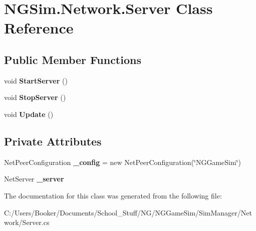 \hypertarget{class_n_g_sim_1_1_network_1_1_server}{}\section{N\+G\+Sim.\+Network.\+Server Class Reference}
\label{class_n_g_sim_1_1_network_1_1_server}
\subsection*{Public Member Functions}
\begin{DoxyCompactItemize}
\item 
\mbox{\label{class_n_g_sim_1_1_network_1_1_server_ad163d27bbb91a29d2df0f96593614671}} 
void {\bfseries Start\+Server} ()
\item 
\mbox{\label{class_n_g_sim_1_1_network_1_1_server_a575bb1a212877a0d59f7a265260ea7c8}} 
void {\bfseries Stop\+Server} ()
\item 
\mbox{\label{class_n_g_sim_1_1_network_1_1_server_a7daa039ef7de7d23dbae2837b572692d}} 
void {\bfseries Update} ()
\end{DoxyCompactItemize}
\subsection*{Private Attributes}
\begin{DoxyCompactItemize}
\item 
\mbox{\label{class_n_g_sim_1_1_network_1_1_server_a2b1f7dcd145e285469d9a95464099e96}} 
Net\+Peer\+Configuration {\bfseries \+\_\+config} = new Net\+Peer\+Configuration(\char`\"{}N\+G\+Game\+Sim\char`\"{})
\item 
\mbox{\label{class_n_g_sim_1_1_network_1_1_server_a9d32349346391d57e80a6fdffb559697}} 
Net\+Server {\bfseries \+\_\+server}
\end{DoxyCompactItemize}


The documentation for this class was generated from the following file\+:\begin{DoxyCompactItemize}
\item 
C\+:/\+Users/\+Booker/\+Documents/\+School\+\_\+\+Stuff/\+N\+G/\+N\+G\+Game\+Sim/\+Sim\+Manager/\+Network/Server.\+cs\end{DoxyCompactItemize}
